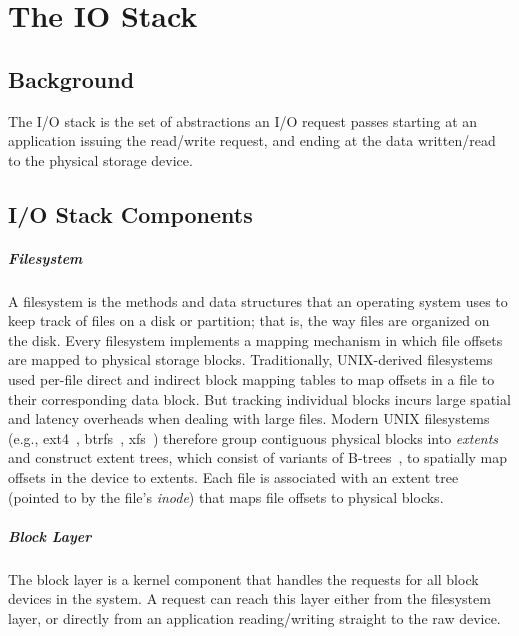 \chapter{The IO Stack}
\label{chap:iostack}

\section{Background}
The I/O stack is the set of abstractions an I/O request passes starting at an application issuing the read/write request, and ending at the data written/read to the physical storage device. 


\section{I/O Stack Components}

\paragraph{Filesystem}
A filesystem is the methods and data structures that an operating system uses to keep track of files on a disk or partition; that is, the way files are organized on the disk.
Every filesystem implements a mapping mechanism in which file offsets are mapped to physical storage blocks.
Traditionally, UNIX-derived filesystems used per-file direct and indirect  block mapping tables to map offsets in a file to their corresponding data block. But tracking individual blocks incurs large spatial and latency
overheads when dealing with large files. Modern UNIX filesystems (e.g., ext4~\cite{mathur07ext4},
btrfs~\cite{rodeh13btrfs}, xfs~\cite{sweeney96xfs}) therefore group contiguous physical blocks into
\emph{extents} and construct extent trees, which consist of variants of B-trees~\cite{comer79btree}, to spatially
map offsets in the device to extents.
Each file is associated with an extent tree (pointed to by the file's \emph{inode}) that maps file offsets to
physical blocks.

\paragraph{Block Layer}
The block layer is a kernel component that handles the requests for all block devices in the system.
A request can reach this layer either from the filesystem layer, or directly from an application reading/writing straight to the raw device.


